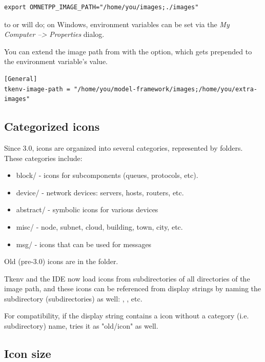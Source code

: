 \begin{verbatim}
export OMNETPP_IMAGE_PATH="/home/you/images;./images"
\end{verbatim}

to  or  will do; on Windows, environment variables
can be set via the \textit{My Computer --> Properties} dialog.

You can extend the image path from  with the
 option, which gets prepended to the environment
variable's value.

\begin{verbatim}
[General]
tkenv-image-path = "/home/you/model-framework/images;/home/you/extra-images"
\end{verbatim}


\subsection{Categorized icons}

Since {\opp} 3.0, icons are organized into several categories, represented
by folders. These categories include:

\begin{itemize}
  \item block/ - icons for subcomponents (queues, protocols, etc).
  \item device/ - network devices: servers, hosts, routers, etc.
  \item abstract/ - symbolic icons for various devices
  \item misc/ - node, subnet, cloud, building, town, city, etc.
  \item msg/ - icons that can be used for messages
\end{itemize}

Old (pre-3.0) icons are in the  folder.

Tkenv and the IDE now load icons from subdirectories of all directories
of the image path, and these icons can be referenced from display strings
by naming the subdirectory (subdirectories) as well:
, , etc.

For compatibility, if the display string contains a icon without
a category (i.e. subdirectory) name, {\opp} tries it as "old/icon" as well.

\subsection{Icon size}

